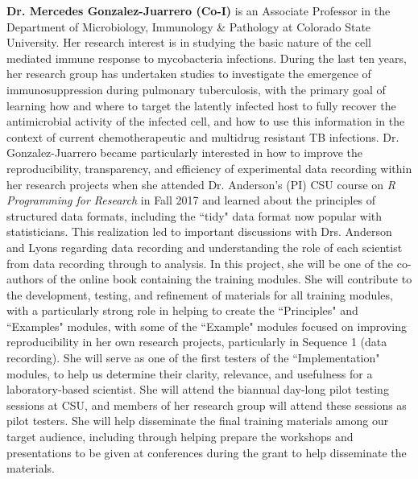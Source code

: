 \documentclass[pdftex,english,11pt,parskip=half]{scrartcl}
\begin{document}
\noindent \textbf{Dr. Mercedes Gonzalez-Juarrero (Co-I)} is an Associate
Professor in the Department of Microbiology, Immunology \& Pathology at Colorado
State University. Her research interest is in studying the basic nature of the
cell mediated immune response to mycobacteria infections. During the last ten
years, her research group has undertaken studies to investigate the emergence of
immunosuppression during pulmonary tuberculosis, with the primary goal of
learning how and where to target the latently infected host to fully recover the
antimicrobial activity of the infected cell, and how to use this information in
the context of current chemotherapeutic and multidrug resistant TB infections.
Dr. Gonzalez-Juarrero became particularly interested in how to improve the
reproducibility, transparency, and efficiency of experimental data recording
within her research projects when she attended Dr. Anderson's (PI) CSU course on
\textit{R Programming for Research} in Fall 2017 and learned about the
principles of structured data formats, including the ``tidy" data format now
popular with statisticians. This realization led to important discussions with
Drs. Anderson and Lyons regarding data recording and understanding the role of
each scientist from data recording through to analysis. In this project, she
will be one of the co-authors of the online book containing the training
modules. She will contribute to the development, testing, and refinement of
materials for all training modules, with a particularly strong role in helping
to create the ``Principles" and ``Examples" modules, with some of the ``Example"
modules focused on improving reproducibility in her own research projects,
particularly in Sequence 1 (data recording). She will serve as one of the first
testers of the ``Implementation" modules, to help us determine their clarity,
relevance, and usefulness for a laboratory-based scientist. She will attend the
biannual day-long pilot testing sessions at CSU, and members of her research
group will attend these sessions as pilot testers. She will help disseminate the
final training materials among our target audience, including through helping
prepare the workshops and presentations to be given at conferences during the
grant to help disseminate the materials.
\end{document}
